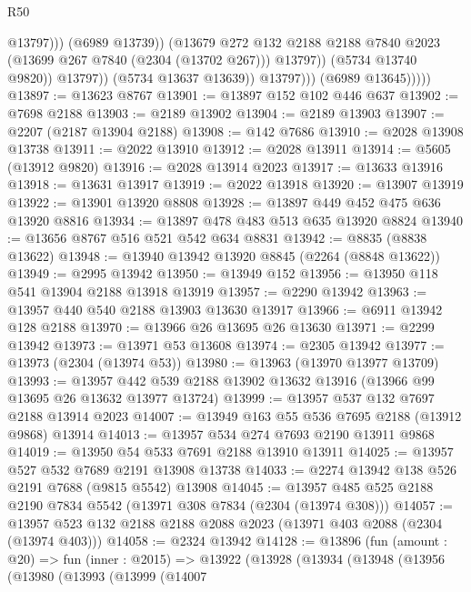 \begin{lexlean}{R50}
\begin{coremodule}
                                    @13797)))
                              (@6989 @13739))
                            (@13679
                              @272
                              @132
                              @2188
                              @2188
                              @7840
                              @2023
                              (@13699 @267 @7840 (@2304 (@13702 @267)))
                              @13797))
                          (@5734 @13740 @9820))
                        @13797))
                    (@5734 @13637 @13639))
                  @13797)))
            (@6989 @13645)))))
@13897 := @13623 @8767
@13901 := @13897 @152 @102 @446 @637
@13902 := @7698 @2188
@13903 := @2189 @13902
@13904 := @2189 @13903
@13907 := @2207 (@2187 @13904 @2188)
@13908 := @142 @7686
@13910 := @2028 @13908 @13738
@13911 := @2022 @13910
@13912 := @2028 @13911
@13914 := @5605 (@13912 @9820)
@13916 := @2028 @13914 @2023
@13917 := @13633 @13916
@13918 := @13631 @13917
@13919 := @2022 @13918
@13920 := @13907 @13919
@13922 := @13901 @13920 @8808
@13928 := @13897 @449 @452 @475 @636 @13920 @8816
@13934 := @13897 @478 @483 @513 @635 @13920 @8824
@13940 := @13656 @8767 @516 @521 @542 @634 @8831
@13942 := @8835 (@8838 @13622)
@13948 := @13940 @13942 @13920 @8845 (@2264 (@8848 @13622))
@13949 := @2995 @13942
@13950 := @13949 @152
@13956 := @13950 @118 @541 @13904 @2188 @13918 @13919
@13957 := @2290 @13942
@13963 := @13957 @440 @540 @2188 @13903 @13630 @13917
@13966 := @6911 @13942 @128 @2188
@13970 := @13966 @26 @13695 @26 @13630
@13971 := @2299 @13942
@13973 := @13971 @53 @13608
@13974 := @2305 @13942
@13977 := @13973 (@2304 (@13974 @53))
@13980 := @13963 (@13970 @13977 @13709)
@13993 := @13957 @442 @539 @2188 @13902 @13632 @13916 (@13966 @99 @13695 @26 @13632 @13977 @13724)
@13999 := @13957 @537 @132 @7697 @2188 @13914 @2023
@14007 := @13949 @163 @55 @536 @7695 @2188 (@13912 @9868) @13914
@14013 := @13957 @534 @274 @7693 @2190 @13911 @9868
@14019 := @13950 @54 @533 @7691 @2188 @13910 @13911
@14025 := @13957 @527 @532 @7689 @2191 @13908 @13738
@14033 := @2274 @13942 @138 @526 @2191 @7688 (@9815 @5542) @13908
@14045 := @13957 @485 @525 @2188 @2190 @7834 @5542 (@13971 @308 @7834 (@2304 (@13974 @308)))
@14057 := @13957 @523 @132 @2188 @2188 @2088 @2023 (@13971 @403 @2088 (@2304 (@13974 @403)))
@14058 := @2324 @13942
@14128 := @13896
    (fun (amount : @20) =>
    fun (inner : @2015) =>
    @13922
      (@13928
        (@13934
          (@13948
            (@13956
              (@13980
                (@13993
                  (@13999
                    (@14007

\end{coremodule}
\end{lexlean}
